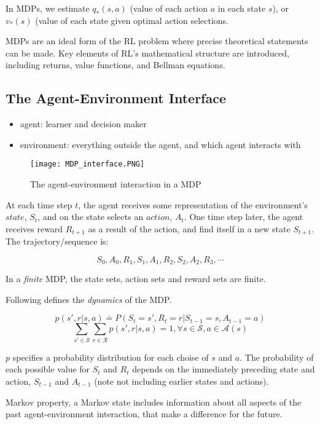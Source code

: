 \documentclass[lang=en,mode=geye,device=normal,color=blue,14pt]{elegantnote}
\DeclareMathOperator*{\1}{\mathbbm{1}}
\begin{document}
In MDPs, we estimate $q_{*}(s,a)$ (value of each action $a$ in each state $s$), or $v_{*}(s)$ (value of each state given optimal action selections.

MDPs are an ideal form of the RL problem where precise theoretical statements can be made.
Key elements of RL's mathematical structure are introduced, including returns, value functions, and Bellman equations.

\subsection{The Agent-Environment Interface}

\begin{itemize}
\item agent: learner and decision maker
\item environment: everything outside the agent, and which agent interacts with
\end{itemize}

\begin{figure}[!h]
  \texttt{[image: MDP\_interface.PNG]}
  \caption{The agent-environment interaction in a MDP}
  \label{fig:MDP_interface}
\end{figure}

At each time step $t$, the agent receives some representation of the environment's $state$, $S_t$, and on the state selects an $action$, $A_t$. One time step later, the agent receives reward $R_{t+1}$ as a result of the action, and find itself in a new state $S_{t+1}$. The trajectory/sequence is:

$$ S_0, A_0, R_1, S_1, A_1, R_2, S_2, A_2, R_3, \cdots $$

In a \textit{finite} MDP, the state sets, action sets and reward sets are finite.

Following defines the \textit{dynamics} of the MDP.

$$ p(s', r| s, a) \doteq P(S_t = s', R_t = r | S_{t-1} = s, A_{t-1} = a) $$
$$ \sum_{s' \in \mathcal{S}} \sum_{r \in \mathcal{R}} p(s',r|s,a) = 1, \forall s \in \mathcal{S}, a \in \mathcal{A}(s) $$

$p$ specifies a probability distribution for each choise of $s$ and $a$.
The probability of each possible value for $S_t$ and $R_t$ depends on the immediately preceding state and action, $S_{t-1}$ and $A_{t-1}$ (note not including earlier states and actions).

\begin{definition}
Markov property, a Markov state includes information about all aspects of the past agent-environment interaction, that make a difference for the future.
\end{definition}
\end{document}
